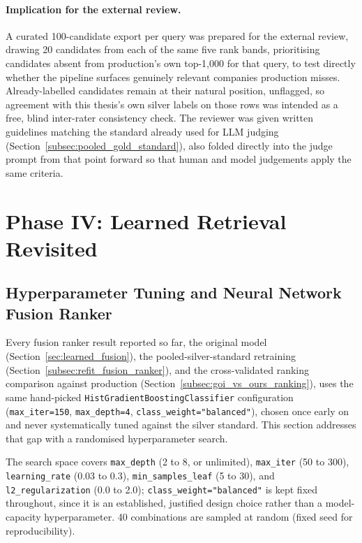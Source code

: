 \documentclass[a4paper,oneside,bibliography=totoc]{scrbook}
\begin{document}
\paragraph{Implication for the external review.} A curated 100-candidate export per query was prepared for the external review, drawing 20 candidates from each of the same five rank bands, prioritising candidates absent from production's own top-1{,}000 for that query, to test directly whether the pipeline surfaces genuinely relevant companies production misses. Already-labelled candidates remain at their natural position, unflagged, so agreement with this thesis's own silver labels on those rows was intended as a free, blind inter-rater consistency check. The reviewer was given written guidelines matching the standard already used for LLM judging (Section~\ref{subsec:pooled_gold_standard}), also folded directly into the judge prompt from that point forward so that human and model judgements apply the same criteria.

\section{Phase IV: Learned Retrieval Revisited}
\label{sec:phase4_method}

\subsection{Hyperparameter Tuning and Neural Network Fusion Ranker}
\label{subsec:hyperparameter_tuning}

Every fusion ranker result reported so far, the original model (Section~\ref{sec:learned_fusion}), the pooled-silver-standard retraining (Section~\ref{subsec:refit_fusion_ranker}), and the cross-validated ranking comparison against production (Section~\ref{subsec:goi_vs_ours_ranking}), uses the same hand-picked \texttt{HistGradientBoostingClassifier} configuration (\texttt{max\_iter=150}, \texttt{max\_depth=4}, \texttt{class\_weight="balanced"}), chosen once early on and never systematically tuned against the silver standard. This section addresses that gap with a randomised hyperparameter search.

The search space covers \texttt{max\_depth} (2 to 8, or unlimited), \texttt{max\_iter} (50 to 300), \texttt{learning\_rate} (0.03 to 0.3), \texttt{min\_samples\_leaf} (5 to 30), and \texttt{l2\_regularization} (0.0 to 2.0); \texttt{class\_weight="balanced"} is kept fixed throughout, since it is an established, justified design choice rather than a model-capacity hyperparameter. 40 combinations are sampled at random (fixed seed for reproducibility).
\end{document}
